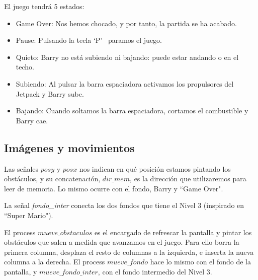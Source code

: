 \documentclass[11pt, a4paper, spanish, openright, twoside]{book}
\begin{document}
El juego tendrá 5 estados:
\begin{itemize}
\item Game Over: Nos hemos chocado, y por tanto, la partida se ha acabado.
\item Pause: Pulsando la tecla `P'  \ paramos el juego.
\item Quieto: Barry no está subiendo ni bajando: puede estar andando o en el techo.
\item Subiendo: Al pulsar la barra espaciadora activamos los propulsores del Jetpack y Barry sube.
\item Bajando: Cuando soltamos la barra espaciadora, cortamos el combustible y Barry cae.
\end{itemize}

\subsection{Imágenes y movimientos}

Las señales $posy$ y $posx$ nos indican en qué posición estamos pintando los obstáculos, y su concatenación, $dir\_mem$, es la dirección que utilizaremos para leer de memoria. Lo mismo ocurre con el fondo, Barry y ``Game Over".

La señal \emph{fondo\_inter} conecta los dos fondos que tiene el Nivel 3 (inspirado en ``Super Mario").

El process $mueve\_obstaculos$ es el encargado de refrescar la pantalla y pintar los obstáculos que salen a medida que avanzamos en el juego. Para ello borra la primera columna, desplaza el resto de columnas a la izquierda, e inserta la nueva columna a la derecha. El process $mueve\_fondo$ hace lo mismo con el fondo de la pantalla, y $mueve\_fondo\_inter$, con el fondo intermedio del Nivel 3.
\end{document}
